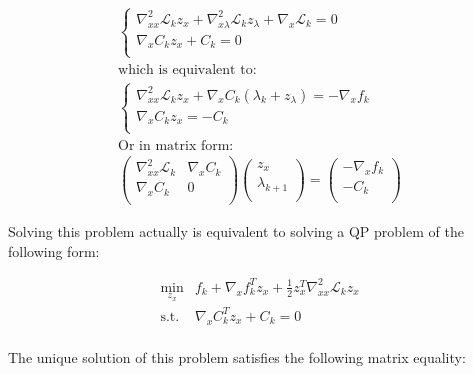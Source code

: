 \begin{equation}
  \label{KKT_1st_order}
  \begin{array}{l}

  \left\{
\begin{array}{l}
  \nabla_{xx}^2\mathcal{L}_k z_x + \nabla_{x\lambda}^2\mathcal{L}_k z_\lambda + \nabla_x\mathcal{L}_k  = 0\\
  \nabla_x C_k z_x + C_k = 0\\
\end{array}
\right. \\
\text{which is equivalent to:}\\
  \left\{
\begin{array}{l}
  \nabla_{xx}^2\mathcal{L}_k z_x + \nabla_{x}C_k (\lambda_k + z_\lambda) = - \nabla_{x}f_k\\
  \nabla_x C_k z_x = - C_k \\
\end{array}
\right. \\
\text{Or in matrix form:}\\
  \begin{pmatrix}
      \nabla_{xx}^2\mathcal{L}_k & \nabla_x C_k\\
      \nabla_x C_k & 0\\
  \end{pmatrix}
  \begin{pmatrix}
      z_x\\
      \lambda_{k+1}\\
  \end{pmatrix}
  =
  \begin{pmatrix}
      - \nabla_{x}f_k\\
      - C_k\\
  \end{pmatrix}
  \end{array}
\end{equation}

Solving this problem actually is equivalent to solving a QP problem of the following form:

\begin{equation}
  \begin{array}{ll}
    \min\limits_{z_x} &f_k + \nabla_x f_k ^T z_x + \frac{1}{2} z_x^T\nabla_{xx}^2\mathcal{L}_k z_x \\
    \text{s.t.} & \nabla_x C_k^T z_x + C_k = 0\\
  \end{array}
\end{equation}

The unique solution of this problem satisfies the following matrix equality:


